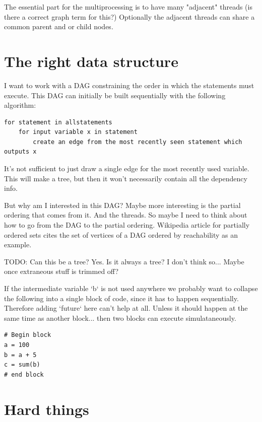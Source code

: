 \documentclass[12pt]{article}
\begin{document}
The essential part for the multiprocessing is to have many "adjacent"
threads (is there a correct graph term for this?)
Optionally the adjacent threads can share a common parent and or child
nodes.

\section{The right data structure}

I want to work with a DAG constraining the order in which the statements
must execute. This DAG can initially be built sequentially with the following
algorithm:

\begin{verbatim}
for statement in allstatements
    for input variable x in statement
        create an edge from the most recently seen statement which outputs x
\end{verbatim}

It's not sufficient to just draw a single edge for the most recently used
variable. This will make a tree, but then it won't necessarily contain all
the dependency info.

But why am I interested in this DAG? Maybe more interesting is the partial
ordering that comes from it. And the threads. So maybe I need to think
about how to go from the DAG to the partial ordering. Wikipedia article for
partially ordered sets cites the set of vertices of a DAG ordered by
reachability as an example.

TODO:
Can this be a tree? Yes. Is it always a tree? I don't think so... Maybe
once extraneous stuff is trimmed off?

If the intermediate variable `b` is not used anywhere we probably want to
collapse the following into a single block of code, since it has to happen
sequentially. Therefore adding `future` here can't help at all. Unless it
should happen at the same time as another block... then two blocks can
execute simulataneously.

\begin{verbatim}
# Begin block
a = 100
b = a + 5
c = sum(b)
# end block
\end{verbatim}

\section{Hard things}
\end{document}
